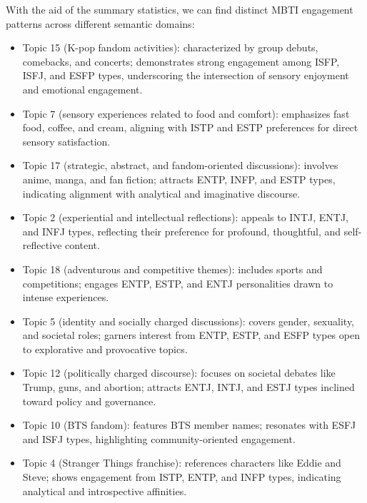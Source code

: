 \documentclass[12pt]{article}
\numberwithin{figure}{section}  %
\begin{document}
	 With the aid of the summary statistics, we can find distinct MBTI
	 engagement patterns across different semantic domains:
	\begin{itemize}
	\item Topic 15 (K-pop fandom activities): characterized by group debuts,
	comebacks, and concerts; demonstrates strong engagement among ISFP, ISFJ,
	and ESFP types, underscoring the intersection of sensory enjoyment and
	emotional engagement.
	\item Topic 7 (sensory experiences related to food and comfort): emphasizes
	fast food, coffee, and cream, aligning with ISTP and ESTP preferences for
	direct sensory satisfaction.
	\item Topic 17 (strategic, abstract, and fandom-oriented discussions):
	involves anime, manga, and fan fiction; attracts ENTP, INFP, and ESTP types,
	indicating alignment with analytical and imaginative discourse.
	\item Topic 2 (experiential and intellectual reflections): appeals to INTJ,
	ENTJ, and INFJ types, reflecting their preference for profound, thoughtful,
	and self-reflective content.
	\item Topic 18 (adventurous and competitive themes): includes sports and
	competitions; engages ENTP, ESTP, and ENTJ personalities drawn to intense
	experiences.
	\item Topic 5 (identity and socially charged discussions): covers gender,
	sexuality, and societal roles; garners interest from ENTP, ESTP, and ESFP
	types open to explorative and provocative topics.
	\item Topic 12 (politically charged discourse): focuses on societal debates
	like Trump, guns, and abortion; attracts ENTJ, INTJ, and ESTJ types inclined
	toward policy and governance.
	\item Topic 10 (BTS fandom): features BTS member names; resonates with ESFJ
	and ISFJ types, highlighting community-oriented engagement.
	\item Topic 4 (Stranger Things franchise): references characters like Eddie
	and Steve; shows engagement from ISTP, ENTP, and INFP types, indicating
	analytical and introspective affinities.
	\end{itemize}
	
\end{document}
